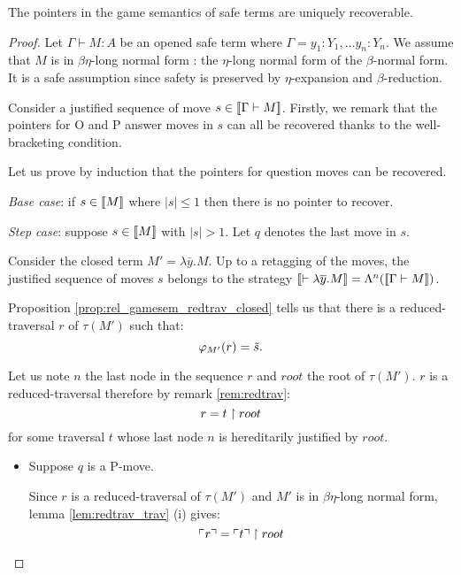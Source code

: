 \begin{prop}
The pointers in the game semantics of safe terms are
uniquely recoverable.
\end{prop}

\begin{proof}
Let $\Gamma \vdash M : A$ be an opened safe term where $\Gamma = y_1:Y_1, \ldots y_n:Y_n$.
We assume that $M$ is in $\beta \eta$-long normal form : the $\eta$-long normal form of the $\beta$-normal form.
It is a safe assumption since safety is preserved by $\eta$-expansion and $\beta$-reduction.

Consider a justified sequence of move $s \in {[\![\Gamma \vdash M ]\!]}$. Firstly,
we remark that the pointers for O and P answer moves in $s$ can all be
recovered thanks to the well-bracketing condition.

Let us prove by induction that the pointers for question moves can be recovered.

\emph{Base case}: if $s \in {[\![M ]\!]}$ where $|s| \leq 1$ then there is no pointer to recover.

\emph{Step case}: suppose $s \in {[\![M ]\!]}$ with $|s| > 1$. Let $q$ denotes the last move in $s$.

Consider the closed term $M'  = \lambda \overline{y} . M$.
Up to a retagging of the moves, the justified sequence of moves $s$ belongs to the strategy
${[\![ \vdash \lambda \overline{y} . M ]\!]} = \Lambda^n({[\![ \Gamma \vdash M ]\!]})$.

Proposition \ref{prop:rel_gamesem_redtrav_closed} tells us that
there is a reduced-traversal $r$ of $\tau(M')$ such that:
$$\varphi_{M'}(r) = \tilde{s}.$$

Let us note $n$ the last node in the sequence $r$
and $root$ the root of $\tau(M')$.
$r$ is a reduced-traversal therefore by remark \ref{rem:redtrav}:
$$ r = t \upharpoonright  root  $$
for some traversal $t$ whose last node $n$ is hereditarily justified by $root$.

\begin{itemize}
\item Suppose $q$ is a P-move.

Since $r$ is a reduced-traversal of $\tau(M')$ and $M'$ is in $\beta
\eta$-long normal form, lemma \ref{lem:redtrav_trav} (i) gives:
\begin{equation}
 \ulcorner r \urcorner = \ulcorner t \urcorner \upharpoonright  root  \label{eq:pre_pview_r}
\end{equation}



\end{itemize}
\end{proof}
